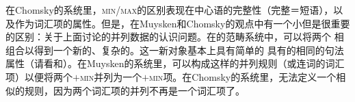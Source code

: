 在Chomsky的系统里，\textsc{min}/\textsc{max}的区别表现在中心语的完整性（完整＝短语），以及作为词汇项的属性。但是，在Muysken和Chomsky的观点中有一个小但是很重要的区别：关于上面讨论的并列数据的认识问题。在\xbartc 的范畴系统中，可以将两个\xzeroc{} 相组合以得到一个新的、复杂的\xzeroc。这一新对象基本上具有简单的\xzeroc{} 具有的相同的句法属性（请看\citealp[]{Jackendoff77a}和\citealp*{GKPS85a}）。在Muysken的系统里，可以构成这样的并列规则（或连词的词汇项）以便将两个$+$\textsc{min}并列为一个$+$\textsc{min}项。在Chomsky的系统里，无法定义一个相似的规则，因为两个词汇项的并列不再是一个词汇项了。


